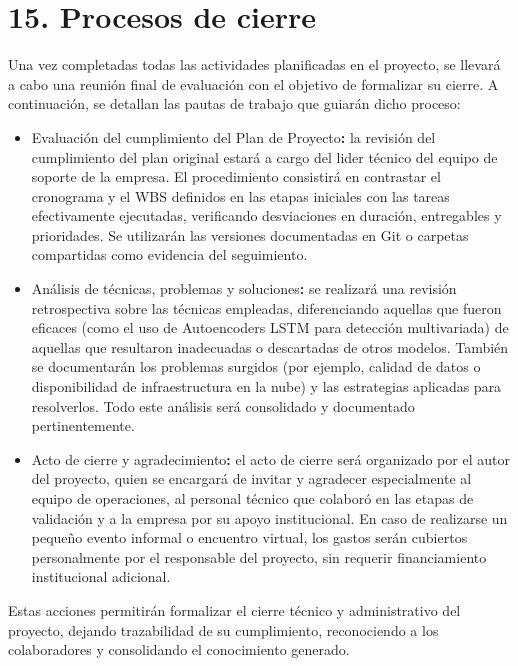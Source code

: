 \documentclass[
11pt, %
]{charter}
\begin{document}
\section{15. Procesos de cierre}    
\label{sec:cierre}


Una vez completadas todas las actividades planificadas en el proyecto, se llevará a cabo una reunión final de evaluación con el objetivo de formalizar su cierre. A continuación, se detallan las pautas de trabajo que guiarán dicho proceso:

\begin{itemize}
    \item Evaluación del cumplimiento del Plan de Proyecto\textbf{:}  la revisión del cumplimiento del plan original estará a cargo del lider técnico del equipo de soporte de la empresa. El procedimiento consistirá en contrastar el cronograma y el WBS definidos en las etapas iniciales con las tareas efectivamente ejecutadas, verificando desviaciones en duración, entregables y prioridades. Se utilizarán las versiones documentadas en Git o carpetas compartidas como evidencia del seguimiento.

    \item Análisis de técnicas, problemas y soluciones\textbf{:}  se realizará una revisión retrospectiva sobre las técnicas empleadas, diferenciando aquellas que fueron eficaces (como el uso de Autoencoders LSTM para detección multivariada) de aquellas que resultaron inadecuadas o descartadas de otros modelos. También se documentarán los problemas surgidos (por ejemplo, calidad de datos o disponibilidad de infraestructura en la nube) y las estrategias aplicadas para resolverlos. Todo este análisis será consolidado y documentado pertinentemente.

    \item Acto de cierre y agradecimiento\textbf{:}  el acto de cierre será organizado por el autor del proyecto, quien se encargará de invitar y agradecer especialmente al equipo de operaciones, al personal técnico que colaboró en las etapas de validación y a la empresa por su apoyo institucional. En caso de realizarse un pequeño evento informal o encuentro virtual, los gastos serán cubiertos personalmente por el responsable del proyecto, sin requerir financiamiento institucional adicional.
\end{itemize}

Estas acciones permitirán formalizar el cierre técnico y administrativo del proyecto, dejando trazabilidad de su cumplimiento, reconociendo a los colaboradores y consolidando el conocimiento generado.
\end{document}
